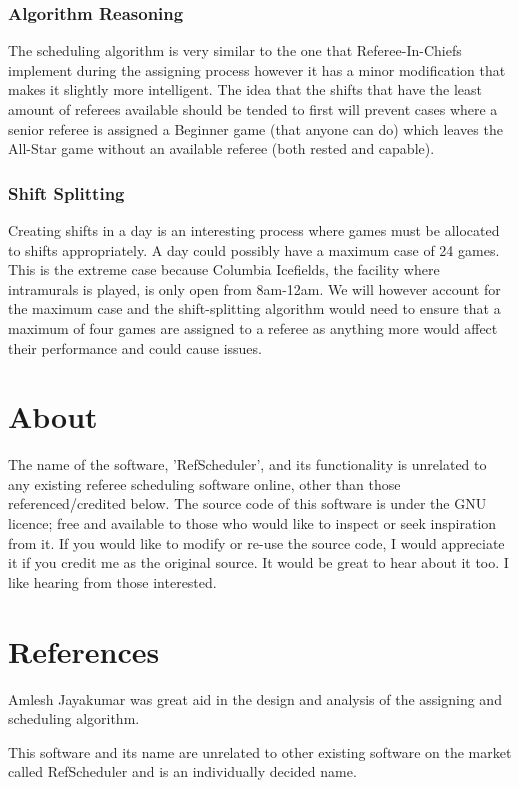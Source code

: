 \documentclass{article}
\begin{document}
\subsubsection{Algorithm Reasoning}
The scheduling algorithm is very similar to the one that Referee-In-Chiefs implement during the assigning process however it has a minor modification that makes it slightly more intelligent. The idea that the shifts that have the least amount of referees available should be tended to first will prevent cases where a senior referee is assigned a Beginner game (that anyone can do) which leaves the All-Star game without an available referee (both rested and capable).
\subsubsection{Shift Splitting}
Creating shifts in a day is an interesting process where games must be allocated to shifts appropriately. A day could possibly have a maximum case of 24 games. This is the extreme case because Columbia Icefields, the facility where intramurals is played, is only open from 8am-12am. We will however account for the maximum case and the shift-splitting algorithm would need to ensure that a maximum of four games are assigned to a referee as anything more would affect their performance and could cause issues.

\section{About}
The name of the software, 'RefScheduler', and its functionality is unrelated to any existing referee scheduling software online, other than those referenced/credited below. The source code of this software is under the GNU licence; free and available to those who would like to inspect or seek inspiration from it. If you would like to modify or re-use the source code, I would appreciate it if you credit me as the original source. It would be great to hear about it too. I like hearing from those interested.

\section{References}
Amlesh Jayakumar was great aid in the design and analysis of the assigning and scheduling algorithm.

This software and its name are unrelated to other existing software on the market called RefScheduler and is an individually decided name.
\end{document}
